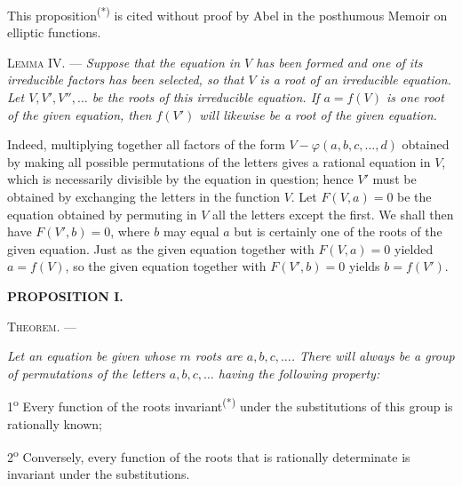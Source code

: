 This proposition\textsuperscript{(*)} is cited without proof by Abel in the
posthumous Memoir on elliptic functions.

\medskip
\noindent\textsc{Lemma IV.} --- \emph{Suppose that the equation in $V$ has been
formed and one of its irreducible factors has been selected, so that $V$ is a
root of an irreducible equation. Let $V,V',V'',\ldots$ be the roots of this
irreducible equation. If $a=f(V)$ is one root of the given equation, then
$f(V')$ will likewise be a root of the given equation.}

Indeed, multiplying together all factors of the form
$V-\varphi(a,b,c,\ldots,d)$ obtained by making all possible permutations of the
letters gives a rational equation in $V$, which is necessarily divisible by
the equation in question; hence $V'$ must be obtained by exchanging the
letters in the function $V$. Let $F(V,a)=0$ be the equation obtained by
permuting in $V$ all the letters except the first. We shall then have
$F(V',b)=0$, where $b$ may equal $a$ but is certainly one of the roots of the
given equation. Just as the given equation together with $F(V,a)=0$ yielded
$a=f(V)$, so the given equation together with $F(V',b)=0$ yields $b=f(V')$.



\begin{center}{\bfseries PROPOSITION I.}\end{center}

\noindent\textsc{Theorem.} --- {\itshape Let an equation be given whose $m$ roots are
$a,b,c,\ldots$. There will always be a group of permutations of the letters
$a,b,c,\ldots$ having the following property:\par

1\textsuperscript{o} Every function of the roots invariant\textsuperscript{(*)} under the substitutions
of this group is rationally known;\par

2\textsuperscript{o} Conversely, every function of the roots that is rationally
determinate is invariant under the substitutions.\par}

